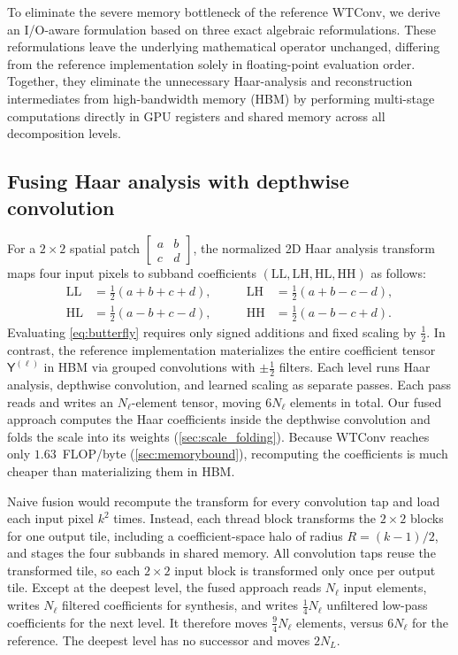 \documentclass[10pt]{article} %
\newcommand{\tY}{\mathsf{Y}}
\theoremstyle{plain}
\begin{document}
To eliminate the severe memory bottleneck of the reference WTConv, we derive an I/O-aware formulation based on three exact algebraic reformulations. These reformulations leave the underlying mathematical operator unchanged, differing from the reference implementation solely in floating-point evaluation order. Together, they eliminate the unnecessary Haar-analysis and reconstruction intermediates from high-bandwidth memory (HBM) by performing multi-stage computations directly in GPU registers and shared memory across all decomposition levels.

\subsection{Fusing Haar analysis with depthwise convolution}
\label{sec:analysis}

For a $2\times2$ spatial patch $\left[\begin{smallmatrix}a & b \\ c & d\end{smallmatrix}\right]$, the normalized 2D Haar analysis transform maps four input pixels to subband coefficients $(\mathrm{LL}, \mathrm{LH}, \mathrm{HL}, \mathrm{HH})$ as follows:
\begin{equation}
\begin{aligned}
\mathrm{LL} &= \tfrac12(a+b+c+d), &\qquad \mathrm{LH} &= \tfrac12(a+b-c-d),\\
\mathrm{HL} &= \tfrac12(a-b+c-d), &\qquad \mathrm{HH} &= \tfrac12(a-b-c+d).
\end{aligned}
\label{eq:butterfly}
\end{equation}
Evaluating \autoref{eq:butterfly} requires only signed additions and fixed scaling by $\tfrac12$. In contrast, the reference implementation materializes the entire coefficient tensor $\tY^{(\ell)}$ in HBM via grouped convolutions with $\pm\tfrac12$ filters. Each level runs Haar analysis, depthwise convolution, and learned scaling as separate passes. Each pass reads and writes an $N_\ell$-element tensor, moving $6N_\ell$ elements in total. Our fused approach computes the Haar coefficients inside the depthwise convolution and folds the scale into its weights (\autoref{sec:scale_folding}). Because WTConv reaches only $1.63$~FLOP/byte (\autoref{sec:memorybound}), recomputing the coefficients is much cheaper than materializing them in HBM.

Naive fusion would recompute the transform for every convolution tap and load each input pixel $k^2$ times. Instead, each thread block transforms the $2\times2$ blocks for one output tile, including a coefficient-space halo of radius $R=(k-1)/2$, and stages the four subbands in shared memory. All convolution taps reuse the transformed tile, so each $2\times2$ input block is transformed only once per output tile. Except at the deepest level, the fused approach reads $N_\ell$ input elements, writes $N_\ell$ filtered coefficients for synthesis, and writes $\tfrac14N_\ell$ unfiltered low-pass coefficients for the next level. It therefore moves $\tfrac94N_\ell$ elements, versus $6N_\ell$ for the reference. The deepest level has no successor and moves $2N_L$.
\end{document}
